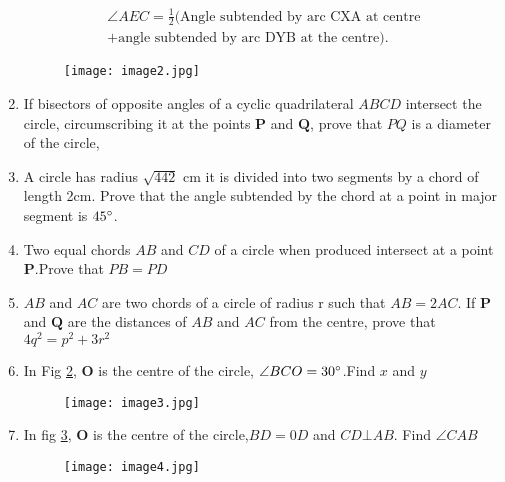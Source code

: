 \documentclass[12pt]{article}
\let\vec\mathbf
\begin{document}
\begin{enumerate}
		\begin{align*}
\angle AEC=\frac{1}{2} (\text{Angle subtended by arc CXA at centre}\\ + \text{angle subtended by arc DYB at the centre}).
		\end{align*}
	\begin{figure}[h!]                                   \texttt{[image: image2.jpg]}                           \caption{}                                       \label{Fig-2}                    \end{figure}
	\item If bisectors of opposite angles of a cyclic quadrilateral $ABCD$ intersect the circle, circumscribing it at the points $\vec{P}$ and $\vec{Q}$, prove that $PQ$ is a diameter of the circle,
\item A circle has radius $\sqrt{442}$ cm it is divided into two segments by a chord of length 2cm. Prove that the angle subtended by the chord at a point in major segment is $45\degree$.
\item Two equal chords $AB$ and $CD$ of a circle when produced intersect at a point $\vec{P}$.Prove that $PB=PD$
\item $AB$ and $AC$ are two chords of a circle of radius r such that $AB=2AC$. If $\vec{P}$ and $\vec{Q}$ are the distances of $AB$ and $AC$ from the centre, prove that $4q^2=p^2+3r^2$
\item In Fig \ref{Fig-3}, $\vec{O}$ is the centre of the circle, $\angle BCO=30\degree$.Find $x$ and $y$
	\begin{figure}[h!]                                   \texttt{[image: image3.jpg]}                            \caption{}                                       \label{Fig-3}                    \end{figure}
	\item In fig \ref{Fig-4}, $\vec{O}$ is the centre of the circle,$BD=0D$ and $CD \bot AB$. Find $\angle CAB$
	\begin{figure}[h!]                      \texttt{[image: image4.jpg]}                              \caption{}                                       \label{Fig-4}                    \end{figure}
\end{enumerate}
	
\end{document}
